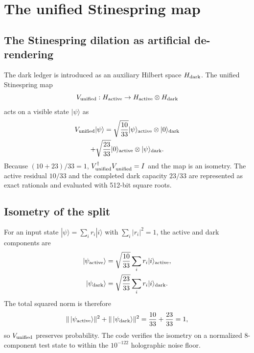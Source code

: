 \documentclass[aps,pra,10pt,onecolumn,superscriptaddress,nofootinbib,longbibliography,floatfix]{revtex4-2}
\begin{document}
\section{The unified Stinespring map}

\subsection{The Stinespring dilation as artificial de-rendering}

The dark ledger is introduced as an auxiliary Hilbert space $H_{\rm dark}$.  The unified Stinespring map
%
\begin{equation}
V_{\rm unified} : H_{\rm active} \to H_{\rm active} \otimes H_{\rm dark}
\end{equation}
%
acts on a visible state $|\psi\rangle$ as
%
\begin{multline}
V_{\rm unified} |\psi\rangle
= \sqrt{\frac{10}{33}} |\psi\rangle_{\rm active}
  \otimes |0\rangle_{\rm dark} \\
+ \sqrt{\frac{23}{33}} |0\rangle_{\rm active}
  \otimes |\psi\rangle_{\rm dark} .
\label{eq:v_unified}
\end{multline}
%
Because $(10+23)/33=1$, $V_{\rm unified}^\dagger V_{\rm unified}^{\phantom{\dagger}} = I$ and the map is an isometry.  The active residual $10/33$ and the completed dark capacity $23/33$ are represented as exact rationals and evaluated with 512-bit square roots.

\subsection{Isometry of the split}

For an input state $|\psi\rangle = \sum_i r_i |i\rangle$ with $\sum_i |r_i|^2 = 1$, the active and dark components are
%
\begin{align}
|\psi_{\rm active}\rangle &= \sqrt{\frac{10}{33}} \sum_i r_i |i\rangle_{\rm active}, \\
|\psi_{\rm dark}\rangle &= \sqrt{\frac{23}{33}} \sum_i r_i |i\rangle_{\rm dark}.
\end{align}
%
The total squared norm is therefore
%
\begin{equation}
\|\,|\psi_{\rm active}\rangle\|^2 + \|\,|\psi_{\rm dark}\rangle\|^2
= \frac{10}{33} + \frac{23}{33} = 1,
\end{equation}
%
so $V_{\rm unified}$ preserves probability.  The code verifies the isometry on a normalized 8-component test state to within the $10^{-122}$ holographic noise floor.
\end{document}

